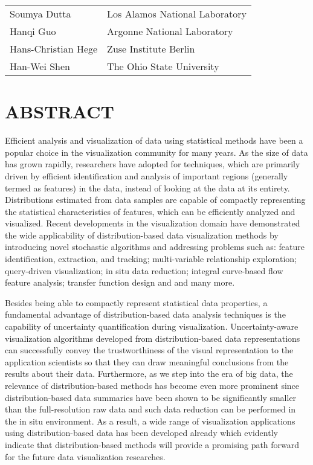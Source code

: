 \documentclass[preprint,journal]{vgtc}       %
\begin{document}
\vspace{-0.1in}
\begin{table}[H]
\begin{tabular}{ll}
Soumya Dutta & Los Alamos National Laboratory\\
Hanqi Guo & Argonne National Laboratory\\
Hans-Christian Hege & Zuse Institute Berlin\\
Han-Wei Shen & The Ohio State University\\
\end{tabular}
\end{table}

\section*{ABSTRACT}
Efficient analysis and visualization of data using statistical methods have been a popular choice in the visualization community for many years. As the size of data has grown rapidly, researchers have adopted for techniques, which are primarily driven by efficient identification and analysis of important regions (generally termed as features) in the data, instead of looking at the data at its entirety. Distributions estimated from data samples are capable of compactly representing the statistical characteristics of features, which can be efficiently analyzed and visualized. Recent developments in the visualization domain have demonstrated the wide  applicability of distribution-based data visualization methods by introducing novel stochastic algorithms and addressing problems such as: feature identification, extraction, and tracking; multi-variable relationship exploration; query-driven visualization; in situ data reduction; integral curve-based flow feature analysis; transfer function design and and many more.

Besides being able to compactly represent statistical data properties, a fundamental advantage of distribution-based data analysis techniques is the capability of uncertainty quantification during visualization. Uncertainty-aware visualization algorithms developed from distribution-based data representations can successfully convey the trustworthiness of the visual representation to the application scientists so that they can draw meaningful conclusions from the results about their data. Furthermore, as we step into the era of big data, the relevance of distribution-based methods has become even more prominent since distribution-based data summaries have been shown to be significantly smaller than the full-resolution raw data and such data reduction can be performed in the in situ environment. As a result, a wide range of visualization applications using distribution-based data has been developed already which evidently indicate that distribution-based methods will provide a promising path forward for the future data visualization researches.
\end{document}
